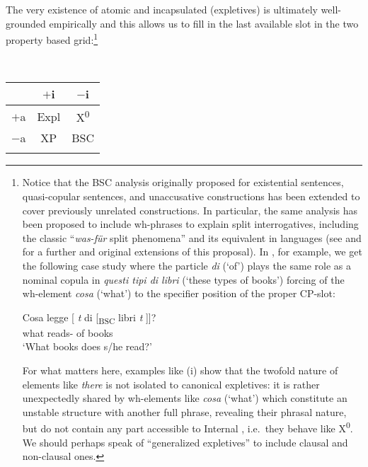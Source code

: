 \documentclass[output=paper]{langsci/langscibook}
\begin{document}
The very existence of atomic and incapsulated  (expletives)
is ultimately well-grounded empirically and this allows us to fill in the last
available slot in the two property based grid:\footnote{Notice that the
    \gls{BSC} analysis originally proposed for existential sentences,
    quasi-copular sentences, and unaccusative constructions has been extended
    to cover previously unrelated constructions. In particular, the same
    analysis has been proposed to include wh-phrases to explain split
    interrogatives, including the classic “\emph{was-für} split phenomena” and
    its equivalent in  languages (see \citealt{Moro2000} and
    \citealt{Ott2012} for a further and original extensions of this proposal).
    In , for example, we get the following case study where the
    particle \emph{di} (`of') plays the same role as a nominal copula
    in \emph{questi tipi di libri} (`these types of books') forcing  of
    the wh-element \emph{cosa} (`what') to the specifier position of the proper
    CP-slot:

\begin{exe}
	\gll Cosa legge [ \emph{t} di [\textsubscript{BSC}  libri  \emph{t} ]]?\\
		what reads-\Tsg{} {} {} of {} books {} {}\\
	\glt `What books does s/he read?'
\end{exe}

For what matters here, examples like (i) show that the twofold nature of
elements like \emph{there} is not isolated to canonical expletives: it is
rather unexpectedly shared by wh-elements like \emph{cosa} (`what') which
constitute an unstable structure with another full phrase, revealing their
phrasal nature, but do not contain any part accessible to Internal , i.e.\
they behave like X\textsuperscript{0}. We should perhaps speak of “generalized
expletives” to include clausal and non-clausal ones.}

\ea\label{ex:key:28.8}\leavevmode\\[-1\baselineskip] %
    \begin{tabular}{ccc}
    \lsptoprule
                & $+$i & $-$i\\
    \midrule
    $+$a & Expl        & X\textsuperscript{0}\\
    $-$a & XP          & BSC\\
    \lspbottomrule
    \end{tabular}
\z
\end{document}
